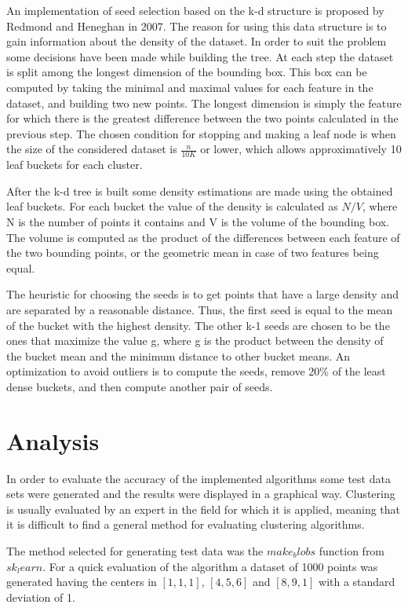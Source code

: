 \documentclass[12pt]{article}
\begin{document}
	An implementation of seed selection based on the k-d structure is proposed by Redmond and Heneghan\cite{KdTreeKmeans} in 2007. The reason for using this data structure is to gain information about the density of the dataset. In order to suit the problem some decisions have been made while building the tree. At each step the dataset is split among the longest dimension of the bounding box. This box can be computed by taking the minimal and maximal values for each feature in the dataset, and building two new points. The longest dimension is simply the feature for which there is the greatest difference between the two points calculated in the previous step. The chosen condition for stopping and making a leaf node is when the size of the considered dataset is \(\frac{n}{10K}\) or lower, which allows approximatively 10 leaf buckets for each cluster.
	
	After the k-d tree is built some density estimations are made using the obtained leaf buckets. For each bucket the value of the density is calculated as \( N / V \), where N is the number of points it contains and V is the volume of the bounding box. The volume is computed as the product of the differences between each feature of the two bounding points, or the geometric mean in case of two features being equal. 
	
	The heuristic for choosing the seeds is to get points that have a large density and are separated by a reasonable distance. Thus, the first seed is equal to the mean of the bucket with the highest density. The other k-1 seeds are chosen to be the ones that maximize the value g, where g is the product between the density of the bucket mean and the minimum distance to other bucket means. An optimization to avoid outliers is to compute the seeds, remove 20\% of the least dense buckets, and then compute another pair of seeds.
	
	\section{Analysis}
	In order to evaluate the accuracy of the implemented algorithms some test data sets were generated and the results were displayed in a graphical way. Clustering is usually evaluated by an expert in the field for which it is applied, meaning that it is difficult to find a general method for evaluating clustering algorithms.
	
	The method selected for generating test data was the $make_blobs$ function from $sk_learn$\cite{sk-learn}. For a quick evaluation of the algorithm a dataset of 1000 points was generated having the centers in $[1, 1, 1]$, $[4, 5, 6]$ and $[8, 9, 1]$ with a standard deviation of 1. 
	
\end{document}
